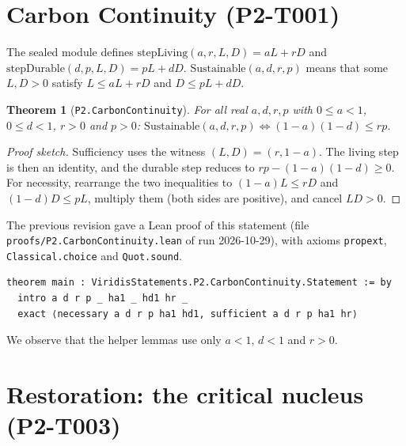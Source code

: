 \documentclass[11pt]{article}
\newtheorem{theorem}{Theorem}
\theoremstyle{definition}
\theoremstyle{remark}
\begin{document}
\section{Carbon Continuity (P2-T001)}
The sealed module defines $\mathrm{stepLiving}(a,r,L,D)=aL+rD$ and $\mathrm{stepDurable}(d,p,L,D)=pL+dD$.
$\mathrm{Sustainable}(a,d,r,p)$ means that some $L,D>0$ satisfy $L\le aL+rD$ and $D\le pL+dD$.
\begin{theorem}[\texttt{P2.CarbonContinuity}]
For all real $a,d,r,p$ with $0\le a<1$, $0\le d<1$, $r>0$ and $p>0$:
$\mathrm{Sustainable}(a,d,r,p)\iff (1-a)(1-d)\le rp$.
\end{theorem}
\begin{proof}[Proof sketch]
Sufficiency uses the witness $(L,D)=(r,1-a)$. The living step is then an identity, and the durable step reduces to
$rp-(1-a)(1-d)\ge 0$. For necessity, rearrange the two inequalities to $(1-a)L\le rD$ and $(1-d)D\le pL$,
multiply them (both sides are positive), and cancel $LD>0$.
\end{proof}
The previous revision gave a Lean proof of this statement (file \texttt{proofs/P2.CarbonContinuity.lean} of run
2026-10-29), with axioms \texttt{propext}, \texttt{Classical.choice} and \texttt{Quot.sound}.
\begin{lstlisting}
theorem main : ViridisStatements.P2.CarbonContinuity.Statement := by
  intro a d r p _ ha1 _ hd1 hr _
  exact ⟨necessary a d r p ha1 hd1, sufficient a d r p ha1 hr⟩
\end{lstlisting}
We observe that the helper lemmas use only $a<1$, $d<1$ and $r>0$.

\section{Restoration: the critical nucleus (P2-T003)}\label{sec:restoration}
\end{document}
